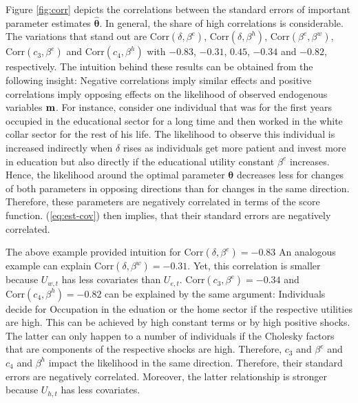 \noindent
Figure \ref{fig:corr} depicts the correlations between the standard errors of important parameter estimates $\pmb{\hat{\theta}}$. In general, the share of high correlations is considerable. The variations that stand out are $\text{Corr}(\delta,\beta^e)$, $\text{Corr}(\delta,\beta^h)$, $\text{Corr}(\beta^e,\beta^w)$, $\text{Corr}(c_3,\beta^e)$ and $\text{Corr}(c_4,\beta^h)$ with $-0.83$, $-0.31$, $0.45$, $-0.34$ and $-0.82$, respectively. The intuition behind these results can be obtained from the following insight: Negative correlations imply similar effects and positive correlations imply opposing effects on the likelihood  of observed endogenous variables $\bold{m}$. For instance, consider one individual that was for the first years occupied in the educational sector for a long time and then worked in the white collar sector for the rest of his life. The likelihood to observe this individual is increased indirectly when $\delta$ rises as individuals get more patient and invest more in education but also directly if the educational utility constant $\beta^e$ increases. Hence, the likelihood around the optimal parameter $\pmb{\theta}$ decreases less for changes of both parameters in opposing directions than for changes in the same direction. Therefore, these parameters are negatively correlated in terms of the score function. (\ref{eq:est-cov}) then implies, that their standard errors are negatively correlated.

The above example provided intuition for $\text{Corr}(\delta,\beta^e)=-0.83$ An analogous example can explain $\text{Corr}(\delta,\beta^w)=-0.31$. Yet, this correlation is smaller because $U_{w,t}$ has less covariates than $U_{e,t}$. $\text{Corr}(c_3,\beta^e)=-0.34$ and $\text{Corr}(c_4,\beta^h)=-0.82$ can be explained by the same argument: Individuals decide for Occupation in the eduation or the home sector if the respective utilities are high. This can be achieved by high constant terms or by high positive shocks. The latter can only happen to a number of individuals if the Cholesky factors that are components of the respective shocks are high. Therefore, $c_3$ and $\beta^e$ and $c_4$ and $\beta^h$ impact the likelihood in the same direction. Therefore, their standard errors are negatively correlated. Moreover, the latter relationship is stronger because $U_{h,t}$ has less covariates.


